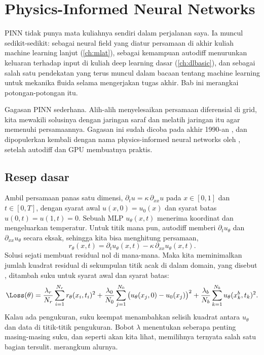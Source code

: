 \chapter{Physics-Informed Neural Networks}
\label{ch:pinn}

PINN tidak punya mata kuliahnya sendiri dalam perjalanan saya. Ia muncul sedikit-sedikit: sebagai
neural field yang diatur persamaan di akhir kuliah machine learning lanjut (\cref{ch:mlat}), sebagai
kemampuan autodiff menurunkan keluaran terhadap input di kuliah deep learning dasar (\cref{ch:dlbasic}),
dan sebagai salah satu pendekatan yang terus muncul dalam bacaan tentang machine learning untuk
mekanika fluida selama mengerjakan tugas akhir. Bab ini merangkai potongan-potongan itu.

Gagasan PINN sederhana. Alih-alih menyelesaikan persamaan diferensial di grid, kita mewakili solusinya
dengan jaringan saraf dan melatih jaringan itu agar memenuhi persamaannya. Gagasan ini sudah dicoba pada
akhir 1990-an \citep{lagaris1998}, dan dipopulerkan kembali dengan nama physics-informed neural networks
oleh \citet{raissi2019}, setelah autodiff dan GPU membuatnya praktis.

\section{Resep dasar}

Ambil persamaan panas satu dimensi, $\partial_tu=\kappa\,\partial_{xx}u$ pada $x\in[0,1]$ dan
$t\in[0,T]$, dengan syarat awal $u(x,0)=u_0(x)$ dan syarat batas $u(0,t)=u(1,t)=0$. Sebuah MLP
$u_\theta(x,t)$ menerima koordinat dan mengeluarkan temperatur. Untuk titik mana pun, autodiff memberi
$\partial_tu_\theta$ dan $\partial_{xx}u_\theta$ secara eksak, sehingga kita bisa menghitung
 persamaan,
\begin{equation}
r_\theta(x,t)=\partial_tu_\theta(x,t)-\kappa\,\partial_{xx}u_\theta(x,t).
\end{equation}
Solusi sejati membuat residual nol di mana-mana. Maka kita meminimalkan jumlah kuadrat residual di
sekumpulan titik acak di dalam domain, yang disebut , ditambah suku untuk syarat
awal dan syarat batas:
\begin{equation}
\Loss(\theta)=\frac{\lambda_r}{N_r}\sum_{i=1}^{N_r}r_\theta(x_i,t_i)^2
+\frac{\lambda_0}{N_0}\sum_{j=1}^{N_0}\big(u_\theta(x_j,0)-u_0(x_j)\big)^2
+\frac{\lambda_b}{N_b}\sum_{k=1}^{N_b}u_\theta(x_k^b,t_k)^2.
\label{eq:pinnloss}
\end{equation}
Kalau ada pengukuran, suku keempat menambahkan selisih kuadrat antara $u_\theta$ dan data di titik-titik
pengukuran. Bobot $\lambda$ menentukan seberapa penting masing-masing suku, dan seperti akan kita lihat,
memilihnya ternyata salah satu bagian tersulit.  merangkum alurnya.

